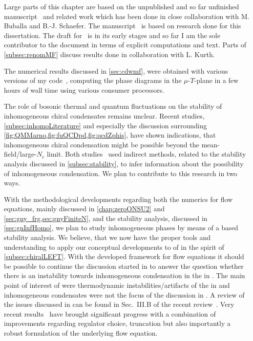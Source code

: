 \newcommand{\cdwM}{\Delta}
\begin{disclaimer}
	Large parts of this chapter are based on the unpublished and so far unfinished manuscript~\cite{Steil:2024RGMF} and related work which has been done in close collaboration with M. Buballa and B.-J. Schaefer.
	The manuscript~\cite{Steil:2024RGMF} is based on research done for this dissertation.
	The draft for~\cite{Steil:2024RGMF} is in its early stages and so far I am the sole contributor to the document in terms of explicit computations and text.
	Parts of \cref{subsec:renomMF} discuss results done in collaboration with L. Kurth.
	
	The numerical results discussed in \cref{sec:cdwmf}, were obtained with various versions of my \Cpp{} code~\cite{Steil:2023QMcpp}, computing the phase diagrams in the $\mu$-$T$-plane in a few hours of wall time using various consumer processors.
\end{disclaimer}

The role of bosonic thermal and quantum fluctuations on the stability of inhomogeneous chiral condensates remains unclear. Recent \frg{} studies, \cf{} \cref{subsec:inhomoLiterature} and especially the discussion surrounding \cref{fig:QMMarno,fig:fuQCDpd,fig:qcdZphis}, have shown indications, that inhomogeneous chiral condensation might be possible beyond the mean-field/large-$N_c$ limit. Both \frg{} studies~\cite{Fu:2019hdw,Tripolt:2017zgc} used indirect methods, related to the stability analysis discussed in \cref{subsec:stability}, to infer information about the possibility of inhomogeneous condensation. 
We plan to contribute to this research in two ways.\bigskip

With the methodological developments regarding both the numerics for \frg{} flow equations, mainly discussed in \cref{chap:zeroONSU2} and \cref{sec:gny_frg,sec:gnyFiniteN}, and the stability analysis, discussed in \cref{sec:gnInfHomo}, we plan to study inhomogeneous phases by means of a \frg{} based stability analysis.
We believe, that we now have the proper tools and understanding to apply our conceptual developments to \loefts{} of \qcd{} in the spirit of \cref{subsec:chiralLEFT}.
With the developed \cfd{} framework for \frg{} flow equations it should be possible to continue the discussion started in  to answer the question whether there is an instability towards inhomogeneous condensation in the \qmm{} in \lpa{}. 
The main point of interest of  were thermodynamic instabilities/artifacts of the \qmm{} in \lpa{} and inhomogeneous condensates were not the focus of the discussion in . 
A review of the issues discussed in  can be found in Sec.~III.B of the recent review~\cite{Fu:2022gou}.
Very recent results~\cite{Ihssen:2023xlp} have brought significant progress with a combination of improvements regarding regulator choice, truncation but also importantly a robust \cfd{} formulation of the underlying flow equation.\bigskip

